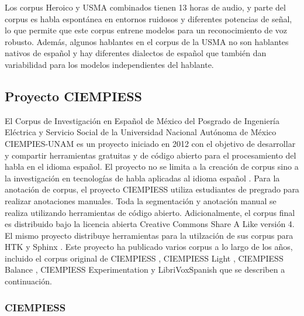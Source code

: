 Los corpus Heroico y USMA combinados tienen 13 horas de audio, y parte del corpus es habla espontánea en entornos ruidosos y diferentes potencias de señal, lo que permite que este corpus entrene modelos para un reconocimiento de voz robusto. Además, algunos hablantes en el corpus de la USMA no son hablantes nativos de español y hay diferentes dialectos de español que también dan variabilidad para los modelos independientes del hablante.

\subsection{Proyecto CIEMPIESS}

El Corpus de Investigación en Español de México del Posgrado de Ingeniería Eléctrica y Servicio Social de la Universidad Nacional Autónoma de México CIEMPIES-UNAM es un proyecto iniciado en 2012 con el objetivo de desarrollar y compartir herramientas gratuitas y de código abierto para el procesamiento del habla en el idioma español. El proyecto no se limita a la creación de corpus sino a la investigación en tecnologías de habla aplicadas al idioma español \cite{CIEMPIESS-Webpage}. Para la anotación de corpus, el proyecto CIEMPIESS utiliza estudiantes de pregrado para realizar anotaciones manuales. Toda la segmentación y anotación manual se realiza utilizando herramientas de código abierto. Adicionalmente, el corpus final es distribuido bajo la licencia abierta Creative Commons Share A Like versión 4. El mismo proyecto distribuye herramientas para la utilzación de sus corpus para HTK\cite{Young1994ThePhilosophy} y Sphinx \cite{Lee1990AnSystem} . Este proyecto ha publicado varios corpus a lo largo de los años, incluido el corpus original de CIEMPIESS \cite {CIEMPIESS}, CIEMPIESS Light \cite {CIEMPIESS-LIGHT}, CIEMPIESS Balance \cite {CIEMPIESS-BALANCE}, CIEMPIESS Experimentation \cite {CIEMPIESS-Experimentation} y LibriVoxSpanish \cite {LibriVox-Spanish} que se describen a continuación.

\subsubsection{CIEMPIESS}

